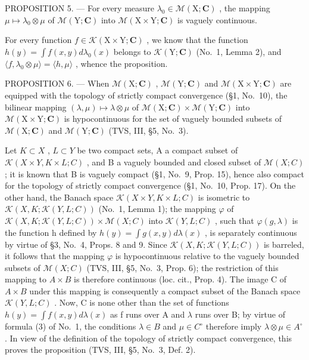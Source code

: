 PROPOSITION 5. --- For every measure \(\lambda_0 \in \mathcal{M}(\mathrm{X};\mathbf{C})\) , the mapping \(\mu \mapsto \lambda_0 \otimes \mu\) of \(\mathcal{M}(\mathrm{Y};\mathbf{C})\) into \(\mathcal{M}(\mathrm{X} \times \mathrm{Y};\mathbf{C})\) is vaguely continuous.

For every function \(f \in \mathcal{K}(\mathrm{X} \times \mathrm{Y}; \mathbf{C})\) , we know that the function \(h(y) = \int f(x, y) d\lambda_0(x)\) belongs to \(\mathcal{K}(\mathrm{Y}; \mathbf{C})\) (No.~1, Lemma 2), and \(\langle f, \lambda_0 \otimes \mu \rangle = \langle h, \mu \rangle\) , whence the proposition.

PROPOSITION 6. --- When \(\mathcal{M}(\mathrm{X};\mathbf{C})\) , \(\mathcal{M}(\mathrm{Y};\mathbf{C})\) and \(\mathcal{M}(\mathrm{X}\times\mathrm{Y};\mathbf{C})\) are equipped with the topology of strictly compact convergence (§1, No.~10), the bilinear mapping \((\lambda,\mu)\mapsto\lambda\otimes\mu\) of \(\mathcal{M}(\mathrm{X};\mathbf{C})\times\mathcal{M}(\mathrm{Y};\mathbf{C})\) into \(\mathcal{M}(\mathrm{X}\times\mathrm{Y};\mathbf{C})\) is hypocontinuous for the set of vaguely bounded subsets of \(\mathcal{M}(\mathrm{X};\mathbf{C})\) and \(\mathcal{M}(\mathrm{Y};\mathbf{C})\) (TVS, III, §5, No.~3).

Let \(K \subset X\) , \(L \subset Y\) be two compact sets, A a compact subset of \(\mathcal{K}(X \times Y, K \times L; C)\) , and B a vaguely bounded and closed subset of \(\mathcal{M}(X; C)\) ; it is known that B is vaguely compact (§1, No.~9, Prop. 15), hence also compact for the topology of strictly compact convergence (§1, No.~10, Prop. 17). On the other hand, the Banach space \(\mathcal{K}(X \times Y, K \times L; C)\) is isometric to \(\mathcal{K}(X, K; \mathcal{K}(Y, L; C))\) (No.~1, Lemma 1); the mapping \(\varphi\) of \(\mathcal{K}(X, K; \mathcal{K}(Y, L; C)) \times \mathcal{M}(X; C)\) into \(\mathcal{K}(Y, L; C)\) , such that \(\varphi(g, \lambda)\) is the function h defined by \(h(y) = \int g(x, y) d\lambda(x)\) , is separately continuous by virtue of §3, No.~4, Props. 8 and 9. Since \(\mathcal{K}(X, K; \mathcal{K}(Y, L; C))\) is barreled, it follows that the mapping \(\varphi\) is hypocontinuous relative to the vaguely bounded subsets of \(\mathcal{M}(X; C)\) (TVS, III, §5, No.~3, Prop. 6); the restriction of this mapping to \(A \times B\) is therefore continuous (loc. cit., Prop. 4). The image C of \(A \times B\) under this mapping is consequently a compact subset of the Banach space \(\mathcal{K}(Y, L; C)\) . Now, C is none other than the set of functions \(h(y) = \int f(x, y) d\lambda(x)\) as f runs over A and \(\lambda\) runs over B; by virtue of formula (3) of No.~1, the conditions \(\lambda \in B\) and \(\mu \in C^{\circ}\) therefore imply \(\lambda \otimes \mu \in A^{\circ}\) . In view of the definition of the topology of strictly compact convergence, this proves the proposition (TVS, III, §5, No.~3, Def. 2).

